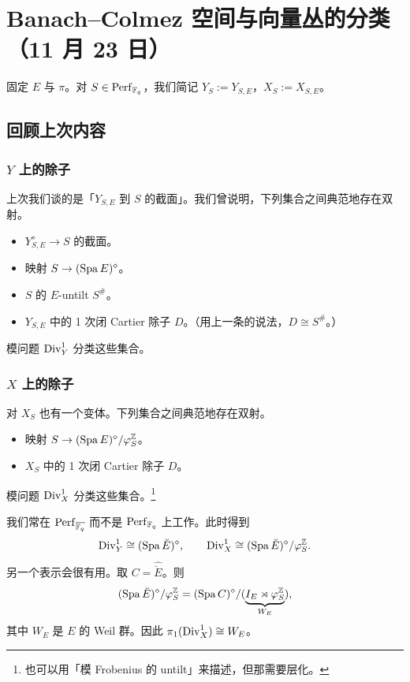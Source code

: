 \section[Banach--Colmez 空间与向量丛的分类]{Banach--Colmez 空间与向量丛的分类（11 月 23 日）}
\setcounter{secnumdepth}{3}


固定 $E$ 与 $\pi$。对 $S\in\mathrm{Perf}_{\mathbb{F}_q}$，我们简记 $Y_S:=Y_{S,E}$，$X_S:=X_{S,E}$。

\subsection{回顾上次内容}

\subsubsection{$Y$ 上的除子}

上次我们谈的是「$Y_{S,E}$ 到 $S$ 的截面」。我们曾说明，下列集合之间典范地存在双射。
\begin{itemize}
  \item $Y_{S,E}^\diamond\to S$ 的截面。
  \item 映射 $S\to(\operatorname{Spa} E)^\diamond$。
  \item $S$ 的 $E$-untilt $S^\#$。
  \item $Y_{S,E}$ 中的 1 次闭 Cartier 除子 $D$。（用上一条的说法，$D\cong S^\#$。）
\end{itemize}
模问题 $\mathrm{Div}^1_Y$ 分类这些集合。

\subsubsection{$X$ 上的除子}

对 $X_S$ 也有一个变体。下列集合之间典范地存在双射。
\begin{itemize}
  \item 映射 $S\to(\operatorname{Spa} E)^\diamond/\varphi_S^{\mathbb{Z}}$。
  \item $X_S$ 中的 1 次闭 Cartier 除子 $D$。
\end{itemize}
模问题 $\mathrm{Div}^1_X$ 分类这些集合。\footnote{也可以用「模 Frobenius 的 untilt」来描述，但那需要层化。}

我们常在 $\mathrm{Perf}_{\overline{\mathbb{F}_q}}$ 而不是 $\mathrm{Perf}_{\mathbb{F}_q}$ 上工作。此时得到
\[
\mathrm{Div}^1_Y\cong(\operatorname{Spa}\breve E)^\diamond,\qquad
\mathrm{Div}^1_X\cong(\operatorname{Spa}\breve E)^\diamond/\varphi_S^{\mathbb{Z}}.
\]
另一个表示会很有用。取 $C=\widehat{\breve E}$。则
\[
(\operatorname{Spa}\breve E)^\diamond/\varphi_S^{\mathbb{Z}}
=(\operatorname{Spa} C)^\diamond/(\underbrace{I_E\rtimes\varphi_S^{\mathbb{Z}}}_{W_E}),
\]
其中 $W_E$ 是 $E$ 的 Weil 群。因此 $\pi_1(\mathrm{Div}^1_X)\cong W_E$。

